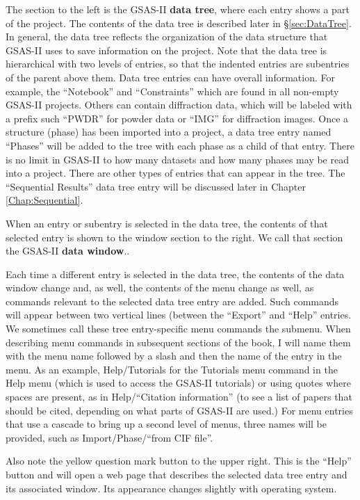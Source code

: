 The section to the left is the GSAS-II \textbf{data tree}, where each entry shows a part of the project. The contents of the data tree is described later in \S\ref{sec:DataTree}. In general, the data tree reflects the organization of the data structure that GSAS-II uses to save information on the project. Note that the data tree is hierarchical with two levels of entries, so that the indented entries are subentries of the parent above them. Data tree entries can have overall information. For example, the  ``Notebook'' and ``Constraints'' which are found in all non-empty GSAS-II projects. Others can contain diffraction data, which will be labeled with a prefix such ``PWDR'' for powder data or ``IMG'' for diffraction images. Once a structure (phase) has been imported into a project, a data tree entry named ``Phases'' will be added to the tree with each phase as a child of that entry. There is no limit in GSAS-II to how many datasets and how many phases may be read into a project. There are other types of entries that can appear in the tree. The ``Sequential Results'' data tree entry will be discussed later in Chapter \ref{Chap:Sequential}. 
 
When an entry or subentry is selected in the data tree, the contents of that selected entry is shown to the window section to the right. We call that section the GSAS-II \textbf{data window}..

Each time a different entry is selected in the data tree, the contents of the data window change and, as well, the contents of the menu change as well, as commands relevant to the selected data tree entry are added. Such commands will appear between two vertical lines (between the ``Export'' and ``Help'' entries. We sometimes call these tree entry-specific menu commands the submenu. When describing menu commands in subsequent sections of the book, I will name them with the menu name followed by a slash and then the name of the entry in the menu. As an example, Help/Tutorials for the Tutorials menu command in the Help menu (which is used to access the GSAS-II tutorials) or using quotes where spaces are present, as in Help/``Citation information'' (to see a list of papers that should be cited, depending on what parts of GSAS-II are used.) For menu entries that use a cascade to bring up a second level of menus, three names will be provided, such as Import/Phase/``from CIF file''.

Also note the yellow question mark button to the upper right. This is the ``Help'' button and will open a web page that describes the selected data tree entry and its associated window. Its appearance changes slightly with operating system.

